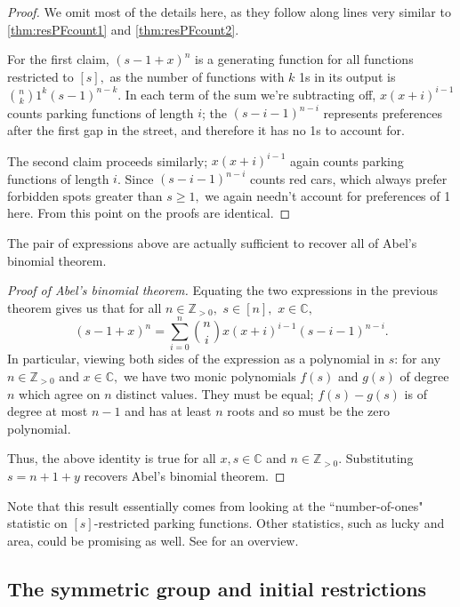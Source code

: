 \documentclass[12 pt]{amsart}
\theoremstyle{definition} %
\theoremstyle{remark} %
\begin{document}
\begin{proof}
    We omit most of the details here, as they follow along lines very similar to \cref{thm:resPFcount1} and \cref{thm:resPFcount2}.
    
    For the first claim, $(s-1+x)^n$ is a generating function for all functions restricted to $[s],$ as the number of functions with $k$ 1s in its output is $\binom{n}{k}1^k(s-1)^{n-k}.$ In each term of the sum we're subtracting off, $x(x+i)^{i-1}$  counts parking functions of length $i$; the $(s-i-1)^{n-i}$ represents preferences after the first gap in the street, and therefore it has no 1s to account for.

    The second claim proceeds similarly; $x(x+i)^{i-1}$ again counts parking functions of length $i$. Since $(s-i-1)^{n-i}$ counts red cars, which always prefer forbidden spots greater than $s\ge1,$ we again needn't account for preferences of 1 here. From this point on the proofs are identical.
\end{proof}

The pair of expressions above are actually sufficient to recover all of Abel's binomial theorem.

\begin{proof}[Proof of Abel's binomial theorem]
	Equating the two expressions in the previous theorem gives us that for all $n\in\mathbb{Z}_{>0},$ $s\in [n],$ $x\in\mathbb{C},$
	\[
		(s-1+x)^{n} = \sum_{i = 0}^{n} \binom{n}{i} x(x + i)^{i - 1} (s - i - 1)^{n - i}.
	\]
In particular, viewing both sides of the expression as a polynomial in $s$: for any $n\in\mathbb{Z}_{>0}$ and $x\in\mathbb{C},$ we have two monic polynomials $f(s)$ and $g(s)$ of degree $n$ which agree on $n$ distinct values. They must be equal; $f(s)-g(s)$ is of degree at most $n-1$ and has at least $n$ roots and so must be the zero polynomial.

Thus, the above identity is true for all $x,s\in\mathbb{C}$ and $n\in\mathbb{Z}_{>0}$. Substituting $s=n+1+y$ recovers Abel's binomial theorem.
\end{proof}

Note that this result essentially comes from looking at the ``number-of-ones" statistic on $[s]$-restricted parking functions. Other statistics, such as lucky and area, could be promising as well. See \cite{yan-survey-2015} for an overview.

\subsection{The symmetric group and initial restrictions}
\end{document}
